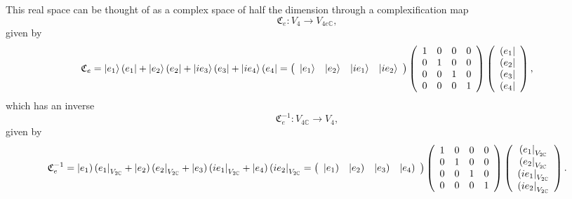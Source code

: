 \documentclass[aps,preprint]{revtex4}%
\begin{document}
This real space can be thought of as a complex space of half the dimension
through a complexification map
\begin{equation}
\mathfrak{C}_{e}:V_{4}\rightarrow V_{4e\mathbb{C}},
\end{equation}
given by%
\begin{equation}
\mathfrak{C}_{e}=\left\vert e_{1}\right\rangle \left(  e_{1}\right\vert
+\left\vert e_{2}\right\rangle \left(  e_{2}\right\vert +\left\vert
ie_{3}\right\rangle \left(  e_{3}\right\vert +\left\vert ie_{4}\right\rangle
\left(  e_{4}\right\vert =\left(
\begin{array}
[c]{cccc}%
\left\vert e_{1}\right\rangle  & \left\vert e_{2}\right\rangle  & \left\vert
ie_{1}\right\rangle  & \left\vert ie_{2}\right\rangle
\end{array}
\right)  \left(
\begin{array}
[c]{cccc}%
1 & 0 & 0 & 0\\
0 & 1 & 0 & 0\\
0 & 0 & 1 & 0\\
0 & 0 & 0 & 1
\end{array}
\right)  \left(
\begin{array}
[c]{c}%
\left(  e_{1}\right\vert \\
\left(  e_{2}\right\vert \\
\left(  e_{3}\right\vert \\
\left(  e_{4}\right\vert
\end{array}
\right)  ,
\end{equation}
which has an inverse
\begin{equation}
\mathfrak{C}_{e}^{-1}:V_{4\mathbb{C}}\rightarrow V_{4},
\end{equation}
given by%
\begin{equation}
\mathfrak{C}_{e}^{-1}=\left\vert e_{1}\right)  \left(  e_{1}\right\vert
_{V_{2\mathbb{C}}}+\left\vert e_{2}\right)  \left(  e_{2}\right\vert
_{V_{2\mathbb{C}}}+\left\vert e_{3}\right)  \left(  ie_{1}\right\vert
_{V_{2\mathbb{C}}}+\left\vert e_{4}\right)  \left(  ie_{2}\right\vert
_{V_{2\mathbb{C}}}=\left(
\begin{array}
[c]{cccc}%
\left\vert e_{1}\right)  & \left\vert e_{2}\right)  & \left\vert e_{3}\right)
& \left\vert e_{4}\right)
\end{array}
\right)  \left(
\begin{array}
[c]{cccc}%
1 & 0 & 0 & 0\\
0 & 1 & 0 & 0\\
0 & 0 & 1 & 0\\
0 & 0 & 0 & 1
\end{array}
\right)  \left(
\begin{array}
[c]{c}%
\left(  e_{1}\right\vert _{V_{2\mathbb{C}}}\\
\left(  e_{2}\right\vert _{V_{2\mathbb{C}}}\\
\left(  ie_{1}\right\vert _{V_{2\mathbb{C}}}\\
\left(  ie_{2}\right\vert _{V_{2\mathbb{C}}}%
\end{array}
\right)  .
\end{equation}
\end{document}
